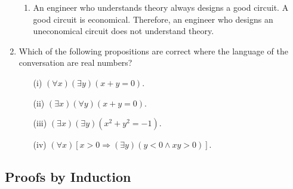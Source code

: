 \documentclass[11pt,paper=b5,footinclude,headinclude]{scrbook} %
\theoremstyle{remark}
\theoremstyle{definition} %
\theoremstyle{theorem} %
\begin{document}
\begin{enumerate}[resume, label=\textbf{Problem \arabic*.}]
\begin{enumerate}[label=(\roman*)]

        \item An engineer who understands theory always designs a good circuit. A good circuit is economical. Therefore, an engineer who designs an uneconomical circuit does not understand theory.

    \end{enumerate}



\item Which of the following propositions are correct where the language of the conversation are real numbers?
\begin{enumerate}
\item[(i)] $(\forall x)(\exists y)(x+y=0)$.
\item[(ii)] $(\exists x)(\forall y)(x+y=0)$.
\item[(iii)] $(\exists x)(\exists y)(x^2+y^2 =-1)$.
\item[(iv)] $(\forall x)[x>0 \Rightarrow (\exists y)(y<0 \wedge xy>0)]$.
\end{enumerate} 
\end{enumerate} 

\subsection{Proofs by Induction}

\end{document}

